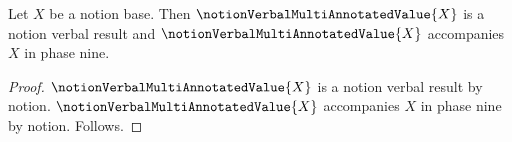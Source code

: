 

\begin{proposition}\label{notion_verbal_result_import}
    Let $X$ be a notion base.
    Then $\notionVerbalMultiAnnotatedValue{X}$ is a notion verbal result and
        $\notionVerbalMultiAnnotatedValue{X}$ accompanies $X$ in phase nine.
\end{proposition}
\begin{proof}
    $\notionVerbalMultiAnnotatedValue{X}$ is a notion verbal result by notion.
    $\notionVerbalMultiAnnotatedValue{X}$ accompanies $X$ in phase nine by notion.
    Follows.
\end{proof}
